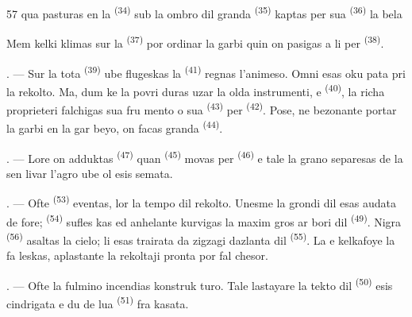 \begin{VUpage}[59]{57}
\VUcontinue
qua pasturas en la  \textsuperscript{(34)} sub la ombro\nl
dil granda  \textsuperscript{(35)} kaptas per sua  \textsuperscript{(36)} la\nl
bela 

\VUblancAlinea
Mem kelki klimas sur la  \textsuperscript{(37)} por\nl
ordinar la garbi quin on pasigas a li per\nl
{} \textsuperscript{(38)}.

. --- Sur la tota  \textsuperscript{(39)} ube flugeskas\nl
la  \textsuperscript{(41)} regnas l'animeso. Omni esas oku\cc
pata pri la rekolto. Ma, dum ke la povri duras\nl
uzar la olda instrumenti,  e \cc
{} \textsuperscript{(40)}, la richa proprieteri falchigas sua fru\cc
mento o sua  \textsuperscript{(43)} per  \textsuperscript{(42)}.\nl
Pose, ne bezonante portar la garbi en la gar\cc
beyo, on facas granda  \textsuperscript{(44)}.

. --- Lore on adduktas  \textsuperscript{(47)}\nl
quan  \textsuperscript{(45)} movas per \cc
{} \textsuperscript{(46)} e tale la grano separesas de la \nl
sen livar l'agro ube ol esis semata.

\VUsaut{5.0mm}
\VUsaut{3.4mm}

. --- Ofte  \textsuperscript{(53)} eventas, lor la tempo\nl
dil rekolto. Unesme la grondi dil  esas\nl
audata de fore;  \textsuperscript{(54)} sufles\cc
kas ed anhelante kurvigas la maxim gros ar\cc
bori dil  \textsuperscript{(49)}. Nigra  \textsuperscript{(56)} asaltas la\nl
cielo; li esas trairata da zigzagi dazlanta dil\nl
{} \textsuperscript{(55)}. La  e kelkafoye la  fa\cc
leskas, aplastante la rekoltaji pronta por fal\cc
chesor.

. --- Ofte la fulmino incendias konstruk\cc
turo. Tale lastayare la tekto dil \cc
{} \textsuperscript{(50)} esis cindrigata e du de lua  \textsuperscript{(51)} fra\cc
kasata.
\end{VUpage}

